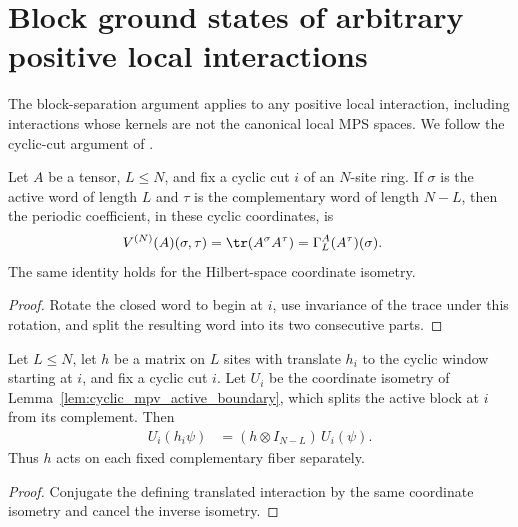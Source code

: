 \section{Block ground states of arbitrary positive local interactions}

The block-separation argument applies to any positive local interaction,
including interactions whose kernels are not the canonical local MPS spaces.
We follow the cyclic-cut argument of
\cite[Theorem~11, proof at lines~1418--1422]{PerezGarcia2007Matrix}.

\begin{lemma}
    \label{lem:cyclic_mpv_active_boundary}
    \leanok
    Let $A$ be a tensor, $L\le N$, and fix a cyclic cut $i$ of an $N$-site
    ring. If $\sigma$ is the active word of length $L$ and $\tau$ is the
    complementary word of length $N-L$, then the periodic coefficient,
    in these cyclic coordinates, is
    \begin{align}
        V^{(N)}(A)(\sigma,\tau)
         & =\tr(A^\sigma A^\tau)=\Gamma_L^A(A^\tau)(\sigma).
        \label{eq:cyclic_mpv_active_boundary}
    \end{align}
    The same identity holds for the Hilbert-space coordinate isometry.
\end{lemma}
\begin{proof}\leanok
    Rotate the closed word to begin at $i$, use invariance of the trace under
    this rotation, and split the resulting word into its two consecutive parts.
\end{proof}

\begin{lemma}
    \label{lem:cyclic_active_local_interaction}
    \leanok
    Let $L\le N$, let $h$ be a matrix on $L$ sites with translate $h_i$ to the
    cyclic window starting at $i$, and fix a cyclic cut $i$.
    Let $U_i$ be the coordinate isometry of
    Lemma~\ref{lem:cyclic_mpv_active_boundary}, which splits the active block
    at $i$ from its complement. Then
    \begin{align}
        U_i(h_i\psi) & =(h\otimes I_{N-L})\,U_i(\psi).
        \label{eq:cyclic_active_local_interaction}
    \end{align}
    Thus $h$ acts on each fixed complementary fiber separately.
\end{lemma}
\begin{proof}\leanok
    Conjugate the defining translated interaction by the same coordinate
    isometry and cancel the inverse isometry.
\end{proof}

